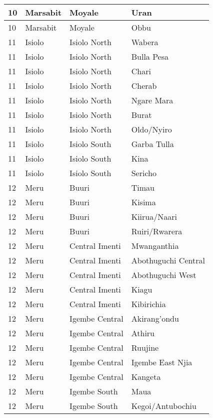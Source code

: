 \begin{table}[!ht]
\begin{tabular}{|l|l|l|l|}
        10 & Marsabit & Moyale & Uran \\ \hline
        10 & Marsabit & Moyale & Obbu \\ \hline
        11 & Isiolo & Isiolo North & Wabera \\ \hline
        11 & Isiolo & Isiolo North & Bulla Pesa \\ \hline
        11 & Isiolo & Isiolo North & Chari \\ \hline
        11 & Isiolo & Isiolo North & Cherab \\ \hline
        11 & Isiolo & Isiolo North & Ngare Mara \\ \hline
        11 & Isiolo & Isiolo North & Burat \\ \hline
        11 & Isiolo & Isiolo North & Oldo/Nyiro \\ \hline
        11 & Isiolo & Isiolo South & Garba Tulla \\ \hline
        11 & Isiolo & Isiolo South & Kina \\ \hline
        11 & Isiolo & Isiolo South & Sericho \\ \hline
        12 & Meru & Buuri & Timau \\ \hline
        12 & Meru & Buuri & Kisima \\ \hline
        12 & Meru & Buuri & Kiirua/Naari \\ \hline
        12 & Meru & Buuri & Ruiri/Rwarera \\ \hline
        12 & Meru & Central Imenti & Mwanganthia \\ \hline
        12 & Meru & Central Imenti & Abothuguchi Central \\ \hline
        12 & Meru & Central Imenti & Abothuguchi West \\ \hline
        12 & Meru & Central Imenti & Kiagu \\ \hline
        12 & Meru & Central Imenti & Kibirichia \\ \hline
        12 & Meru & Igembe Central & Akirang’ondu \\ \hline
        12 & Meru & Igembe Central & Athiru \\ \hline
        12 & Meru & Igembe Central & Ruujine \\ \hline
        12 & Meru & Igembe Central & Igembe East Njia \\ \hline
        12 & Meru & Igembe Central & Kangeta \\ \hline
        12 & Meru & Igembe South & Maua \\ \hline
        12 & Meru & Igembe South & Kegoi/Antubochiu \\ \hline

\end{tabular}
\end{table}

